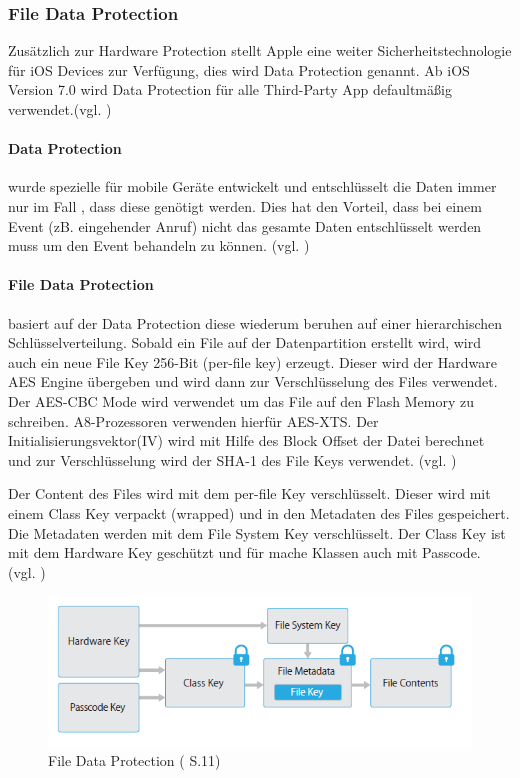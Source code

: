 \subsubsection{File Data Protection}
\label{sec:FileDataProtection}

Zusätzlich zur Hardware Protection stellt Apple eine weiter Sicherheitstechnologie für iOS Devices zur Verfügung, dies wird Data Protection genannt. Ab iOS Version 7.0 wird Data Protection für alle Third-Party App defaultmäßig verwendet.(vgl. \cite{iOSSec[5], iOSSec[2],iOSSec[1], Apple[4], Apple[5], Apple[6], Apple[3]})

\paragraph{Data Protection} wurde spezielle für mobile Geräte entwickelt und entschlüsselt die Daten immer nur im Fall , dass diese genötigt werden. Dies hat den Vorteil, dass bei einem Event (zB. eingehender Anruf) nicht das gesamte Daten entschlüsselt werden muss um den Event behandeln zu können. (vgl. \cite{Apple[4]})

\paragraph{File Data Protection} basiert auf der Data Protection diese wiederum beruhen auf einer hierarchischen Schlüsselverteilung. Sobald ein File auf der Datenpartition erstellt wird, wird auch ein neue File Key 256-Bit (\glqq per-file key\grqq) erzeugt. Dieser wird der Hardware AES Engine übergeben und wird dann zur Verschlüsselung des Files verwendet.  Der AES-CBC Mode wird verwendet um das File auf den Flash Memory zu schreiben. A8-Prozessoren verwenden hierfür AES-XTS.  Der Initialisierungsvektor(IV) wird mit Hilfe des Block Offset der Datei berechnet und zur Verschlüsselung wird der SHA-1 des File Keys verwendet. (vgl. \cite{iOSSec[5], iOSSec[2],iOSSec[1], Apple[4], Apple[5], Apple[6], Apple[3]})

Der Content des Files wird mit dem per-file Key verschlüsselt. Dieser wird mit einem Class Key verpackt (wrapped) und in den Metadaten des Files gespeichert. Die Metadaten werden mit dem File System Key verschlüsselt. Der Class Key ist mit dem Hardware Key geschützt und für mache Klassen auch mit Passcode. (vgl. \cite{iOSSec[5], iOSSec[2],iOSSec[1], Apple[4], Apple[5], Apple[6], Apple[3]})
\begin{figure}[!ht]
        \centering
        \includegraphics[scale=0.9]{fileDataProtection.PNG}
        \caption{File Data Protection (\cite{Apple[4]} S.11)}
        \label{fig:FileDataProtection}
\end{figure}

